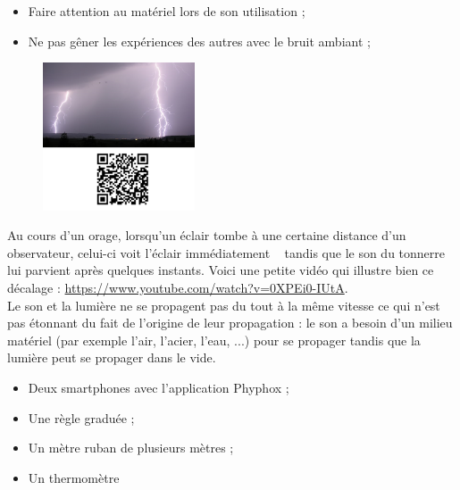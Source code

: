 \begin{tcolorbox}[colback=red!5!white,colframe=red!75!black,title= Consignes :]
\begin{itemize}
    \item Faire attention au matériel lors de son utilisation ;
    \item Ne pas gêner les expériences des autres avec le bruit ambiant ;
\end{itemize}
\end{tcolorbox}


\begin{tcolorbox}[colback=orange!5!white,colframe=orange!75!black,title= Scénario:]
\begin{figure}
\vspace{-0.6cm}
    \centering
     \includegraphics[width=0.4\textwidth]{Images/TP/TP7/Orage.png}
   \end{figure}
Au cours d'un orage, lorsqu'un éclair tombe à une certaine distance d'un observateur, celui-ci voit l'éclair \og immédiatement \fg~ tandis que le son du tonnerre lui parvient après quelques instants. Voici une petite vidéo qui illustre bien ce décalage : \url{https://www.youtube.com/watch?v=0XPEi0-IUtA}.\\
Le son et la lumière ne se propagent pas du tout à la même vitesse ce qui n'est pas étonnant du fait de l'origine de leur propagation : le son a besoin d'un milieu matériel (par exemple l'air, l'acier, l'eau, ...) pour se propager tandis que la lumière peut se propager dans le vide.\\

\end{tcolorbox}


\begin{mdframed}[style=autreexo]
\textbf{}
\begin{itemize}
    \item Deux smartphones avec l'application Phyphox ;
    \item Une règle graduée ;
    \item Un mètre ruban de plusieurs mètres ;
    \item Un thermomètre
\end{itemize}
\end{mdframed}
 

